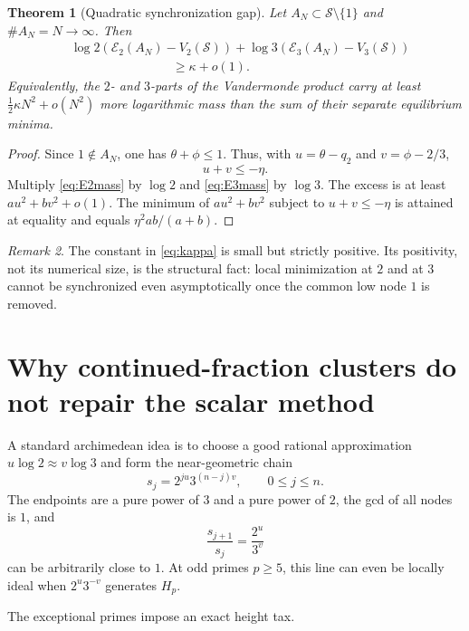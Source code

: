 \documentclass[11pt]{article}
\newtheorem{theorem}{Theorem}[section]
\theoremstyle{definition}
\theoremstyle{remark}
\newtheorem{remark}[theorem]{Remark}
\newcommand{\calS}{\mathcal S}
\newcommand{\calE}{\mathcal E}
\begin{document}
\begin{theorem}[Quadratic synchronization gap]\label{thm:quadratic-gap}
Let $A_N\subset\calS\setminus\{1\}$ and $\#A_N=N\to\infty$.  Then
\begin{align}\label{eq:gap}
 &\log2\left(\calE_2(A_N)-V_2(\calS)\right)
 +\log3\left(\calE_3(A_N)-V_3(\calS)\right)\\
 &\hspace{8em}\ge \kappa+o(1).
\end{align}
Equivalently, the $2$- and $3$-parts of the Vandermonde product carry at least
$\frac12\kappa N^2+o(N^2)$ more logarithmic mass than the sum of their separate equilibrium minima.
\end{theorem}
\begin{proof}
Since $1\notin A_N$, one has $\theta+\phi\le1$.  Thus, with
$u=\theta-q_2$ and $v=\phi-2/3$,
\[
       u+v\le-\eta.
\]
Multiply \eqref{eq:E2mass} by $\log2$ and \eqref{eq:E3mass} by $\log3$.  The excess is at least
$au^2+bv^2+o(1)$.  The minimum of $au^2+bv^2$ subject to $u+v\le-\eta$ is attained at equality and equals $\eta^2ab/(a+b)$.
\end{proof}

\begin{remark}
The constant in \eqref{eq:kappa} is small but strictly positive.  Its positivity, not its numerical size, is the structural fact: local minimization at $2$ and at $3$ cannot be synchronized even asymptotically once the common low node $1$ is removed.
\end{remark}

\section{Why continued-fraction clusters do not repair the scalar method}

A standard archimedean idea is to choose a good rational approximation
$u\log2\approx v\log3$ and form the near-geometric chain
\begin{equation}\label{eq:near-geometric}
       s_j=2^{ju}3^{(n-j)v},\qquad 0\le j\le n.
\end{equation}
The endpoints are a pure power of $3$ and a pure power of $2$, the gcd of all nodes is $1$, and
\[
       \frac{s_{j+1}}{s_j}=\frac{2^u}{3^v}
\]
can be arbitrarily close to $1$.  At odd primes $p\ge5$, this line can even be locally ideal when $2^u3^{-v}$ generates $H_p$.

The exceptional primes impose an exact height tax.
\end{document}
